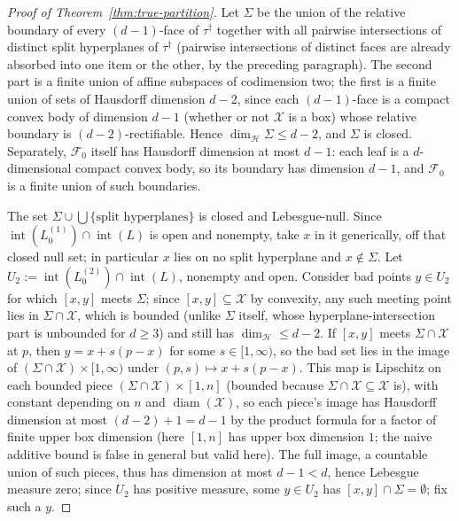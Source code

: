 \documentclass[11pt]{article}
\theoremstyle{plain}
\theoremstyle{definition}
\theoremstyle{remark}
\newcommand{\cX}{\mathcal{X}}
\newcommand{\cF}{\mathcal{F}}
\begin{document}
\begin{proof}[Proof of Theorem~\ref{thm:true-partition}]
Let \(\Sigma\) be the union of the relative boundary of every \((d-1)\)-face
of \(\tau^{\dagger}\) together with all pairwise intersections of distinct
split hyperplanes of \(\tau^{\dagger}\) (pairwise intersections of distinct
faces are already absorbed into one item or the other, by the preceding
paragraph). The second part is a finite union of affine subspaces of
codimension two; the first is a finite union of sets of Hausdorff dimension
\(d-2\), since each \((d-1)\)-face is a compact convex body of dimension
\(d-1\) (whether or not \(\cX\) is a box) whose relative boundary is
\((d-2)\)-rectifiable. Hence \(\dim_{\mathcal H}\Sigma\le d-2\), and \(\Sigma\)
is closed. Separately, \(\cF_0\) itself has Hausdorff dimension at most
\(d-1\): each leaf is a \(d\)-dimensional compact convex body, so its
boundary has dimension \(d-1\), and \(\cF_0\) is a finite union of such
boundaries.

The set \(\Sigma\cup\bigcup\{\text{split hyperplanes}\}\) is closed and
Lebesgue-null. Since \(\operatorname{int}(L_0^{(1)})\cap\operatorname{int}(L)\)
is open and nonempty, take \(x\) in it generically, off that closed null
set; in particular \(x\) lies on no split hyperplane and \(x\notin\Sigma\).
Let \(U_2:=\operatorname{int}(L_0^{(2)})\cap\operatorname{int}(L)\), nonempty
and open. Consider bad points \(y\in U_2\) for which \([x,y]\) meets
\(\Sigma\); since \([x,y]\subseteq\cX\) by convexity, any such meeting point
lies in \(\Sigma\cap\cX\), which is bounded (unlike \(\Sigma\) itself, whose
hyperplane-intersection part is unbounded for \(d\ge3\)) and still has
\(\dim_{\mathcal H}\le d-2\). If \([x,y]\) meets \(\Sigma\cap\cX\) at \(p\),
then \(y=x+s(p-x)\) for some \(s\in[1,\infty)\), so the bad set lies in the
image of \((\Sigma\cap\cX)\times[1,\infty)\) under
\((p,s)\mapsto x+s(p-x)\). This map is Lipschitz on each bounded piece
\((\Sigma\cap\cX)\times[1,n]\) (bounded because \(\Sigma\cap\cX\subseteq\cX\)
is), with constant depending on \(n\) and \(\operatorname{diam}(\cX)\), so
each piece's image has Hausdorff dimension at most \((d-2)+1=d-1\) by the
product formula for a factor of finite upper box dimension (here \([1,n]\)
has upper box dimension \(1\); the naive additive bound is false in general
but valid here). The full image, a countable union of such pieces, thus has
dimension at most \(d-1<d\), hence Lebesgue measure zero; since \(U_2\) has
positive measure, some \(y\in U_2\) has \([x,y]\cap\Sigma=\emptyset\); fix
such a \(y\).


\end{proof}
\end{document}
